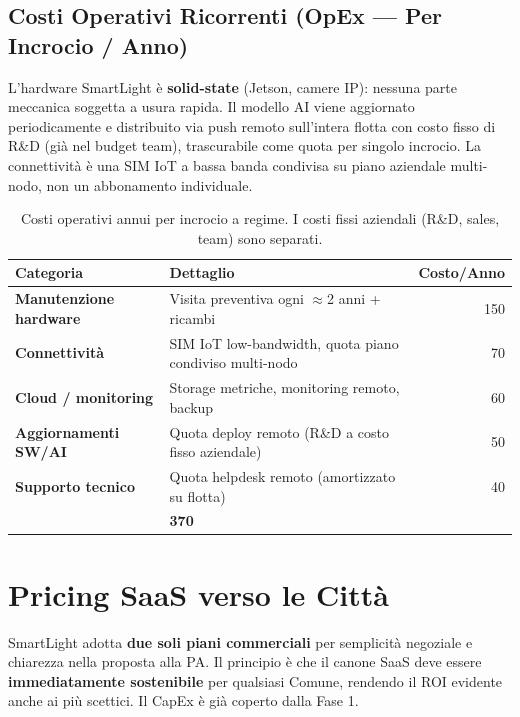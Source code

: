 \documentclass[a4paper,11pt]{article}
\begin{document}
\subsection{Costi Operativi Ricorrenti (OpEx --- Per Incrocio / Anno)}

L'hardware SmartLight è \textbf{solid-state} (Jetson, camere IP): nessuna parte meccanica soggetta a usura rapida. Il modello AI viene aggiornato periodicamente e distribuito via push remoto sull'intera flotta con costo fisso di R\&D (già nel budget team), trascurabile come quota per singolo incrocio. La connettività è una SIM IoT a bassa banda condivisa su piano aziendale multi-nodo, non un abbonamento individuale.

\begin{table}[h!]
\centering
\begin{tabular}{>{\bfseries}l l r}
\toprule
Categoria & Dettaglio & Costo/Anno \\
\midrule
Manutenzione hardware & Visita preventiva ogni $\approx$2 anni + ricambi         & \texteuro{}150 \\
Connettività          & SIM IoT low-bandwidth, quota piano condiviso multi-nodo  & \texteuro{}70  \\
Cloud / monitoring    & Storage metriche, monitoring remoto, backup              & \texteuro{}60  \\
Aggiornamenti SW/AI   & Quota deploy remoto (R\&D a costo fisso aziendale)       & \texteuro{}50  \\
Supporto tecnico      & Quota helpdesk remoto (amortizzato su flotta)            & \texteuro{}40  \\
\midrule
\multicolumn{2}{l}{\textbf{TOTALE OpEx per Incrocio / Anno}} & \textbf{\texteuro{}370} \\
\bottomrule
\end{tabular}
\caption{Costi operativi annui per incrocio a regime. I costi fissi aziendali (R\&D, sales, team) sono separati.}
\end{table}

\section{Pricing SaaS verso le Città}

SmartLight adotta \textbf{due soli piani commerciali} per semplicità negoziale
e chiarezza nella proposta alla PA. Il principio è che il canone SaaS deve
essere \textbf{immediatamente sostenibile} per qualsiasi Comune, rendendo
il ROI evidente anche ai più scettici. Il CapEx è già coperto dalla Fase 1.
\end{document}

